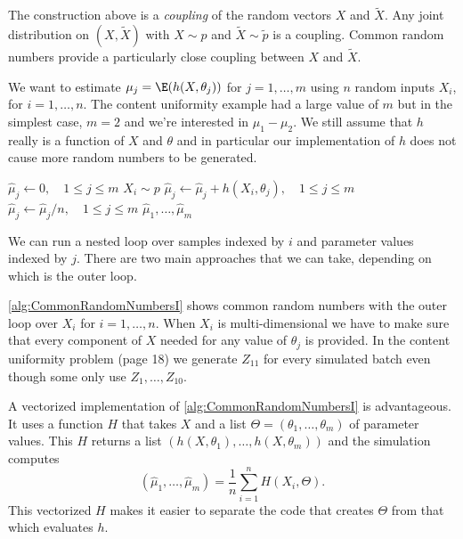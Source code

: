 The construction above is a \textit{coupling} of the random vectors \(X\) and \(\widetilde{X}\). Any joint distribution on \((X, \widetilde{X})\) with \(X \sim p\) and \(\widetilde{X} \sim \tilde{p}\) is a coupling. Common random numbers provide a particularly close coupling between \(X\) and \(\widetilde{X}\).

We want to estimate \(\mu_j = \E(h(X, \theta_j))\) for \(j = 1, \dots, m\) using \(n\) random inputs \(X_i\), for \(i = 1, \dots, n\). The content uniformity example had a large value of \(m\) but in the simplest case, \(m=2\) and we're interested in \(\mu_1 - \mu_2\). We still assume that \(h\) really is a function of \(X\) and \(\theta\) and in particular our implementation of \(h\) does not cause more random numbers to be generated.

\begin{algorithm}[H]
	\caption{Common Random Numbers Algorithm I}
	\label{alg:CommonRandomNumbersI}
	\begin{algorithmic}[1]
		\State {}
		\State \(\hat{\mu}_j \gets 0, \quad 1 \le j \le m\)
		\State \(X_i \sim p\)
		\State \(\hat{\mu}_j \gets \hat{\mu}_j + h(X_i, \theta_j), \quad 1 \le j \le m\)
		\EndFor
		\State \(\hat{\mu}_j \gets \hat{\mu}_j / n, \quad 1 \le j \le m\)
		\State \Return \(\hat{\mu}_1, \dots, \hat{\mu}_m\)
	\end{algorithmic}
\end{algorithm}

We can run a nested loop over samples indexed by \(i\) and parameter values indexed by \(j\). There are two main approaches that we can take, depending on which is the outer loop.

\cref{alg:CommonRandomNumbersI} shows common random numbers with the outer loop over \(X_i\) for \(i = 1, \dots, n\). When \(X_i\) is multi-dimensional we have to make sure that every component of \(X\) needed for any value of \(\theta_j\) is provided. In the content uniformity problem (page 18) we generate \(Z_{11}\) for every simulated batch even though some only use \(Z_1, \dots, Z_{10}\).

A vectorized implementation of \cref{alg:CommonRandomNumbersI} is advantageous. It uses a function \(H\) that takes \(X\) and a list \(\Theta = (\theta_1, \dots, \theta_m)\) of parameter values. This \(H\) returns a list \((h(X, \theta_1), \dots, h(X, \theta_m))\) and the simulation computes
\begin{equation}
	(\hat{\mu}_1, \dots, \hat{\mu}_m) = \frac{1}{n} \sum_{i=1}^n H(X_i, \Theta).
	\label{eq:VectorizedCommonRandomNumbers}
\end{equation}
This vectorized \(H\) makes it easier to separate the code that creates \(\Theta\) from that which evaluates \(h\).

